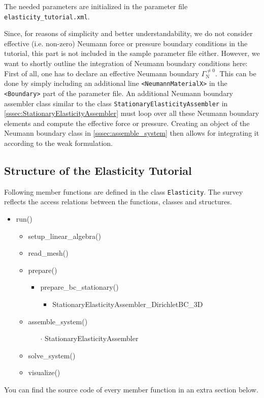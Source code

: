 \documentclass[a4paper, 11pt, twoside]{article}
\theoremstyle{plain}
\theoremstyle{definition}
\begin{document}
The needed parameters are initialized in the parameter file \verb'elasticity_tutorial.xml'.



Since, for reasons of simplicity and better understandability, we do not consider effective (i.e. non-zero) Neumann force or pressure boundary conditions in the tutorial, this part is not included in the sample parameter file either.
However, we want to shortly outline the integration of Neumann boundary conditions here:
First of all, one has to declare an effective Neumann boundary $\Gamma_\text{N}^{\neq 0}$. 
This can be done by simply including an additional line \verb'<NeumannMaterialX>' in the \verb'<Boundary>' part of the parameter file. 
An additional Neumann boundary assembler class similar to the class \verb'StationaryElasticityAssembler' in \ref{sssec:StationaryElasticityAssembler} must loop over all these Neumann boundary elements and compute the effective force or pressure. 
Creating an object of the Neumann boundary class in \ref{sssec:assemble_system} then allows for integrating it according to the weak formulation.







\subsection{Structure of the Elasticity Tutorial}

Following member functions are defined in the class \verb'Elasticity'.
The survey reflects the access relations between the functions, classes and structures. 
 \begin{itemize}
    \item run()
    \begin{itemize}
		\item setup\_linear\_algebra()
		\item read\_mesh()
		\item prepare()
    \begin{itemize}
      \item prepare\_bc\_stationary()
      \begin{itemize}
        \item StationaryElasticityAssembler\_DirichletBC\_3D
      \end{itemize}
    \end{itemize}
		\item assemble\_system()
    \begin{itemize}
		\setlength{\itemindent}{18px}
        \item[$\cdot$] StationaryElasticityAssembler
    \end{itemize}
		\item solve\_system()
		\item visualize()
    \end{itemize}
 \end{itemize} 
You can find the source code of every member function in an extra section below. 
\end{document}
